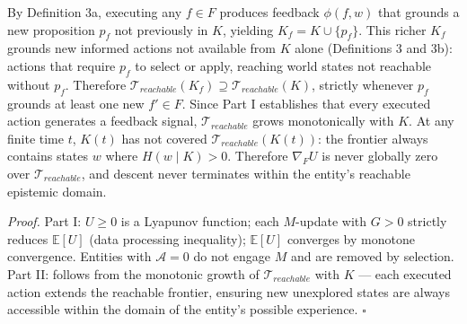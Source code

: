 \documentclass[
]{article}
\begin{document}
By Definition 3a, executing any \(f \in F\) produces feedback
\(\phi(f, w)\) that grounds a new proposition \(p_f\) not previously in
\(K\), yielding \(K_f = K \cup \{p_f\}\). This richer \(K_f\) grounds
new informed actions not available from \(K\) alone (Definitions 3 and
3b): actions that require \(p_f\) to select or apply, reaching world
states not reachable without \(p_f\). Therefore
\(\mathcal{T}_{reachable}(K_f) \supseteq
\mathcal{T}_{reachable}(K)\), strictly whenever \(p_f\) grounds at least
one new \(f' \in F\). Since Part I establishes that every executed
action generates a feedback signal, \(\mathcal{T}_{reachable}\) grows
monotonically with \(K\). At any finite time \(t\), \(K(t)\) has not
covered \(\mathcal{T}_{reachable}(K(t))\): the frontier always contains
states \(w\) where \(H(w \mid K) > 0\). Therefore \(\nabla_F U\) is
never globally zero over \(\mathcal{T}_{reachable}\), and descent never
terminates within the entity's reachable epistemic domain.

\emph{Proof.} Part I: \(U \geq 0\) is a Lyapunov function; each
\(M\)-update with \(G > 0\) strictly reduces \(\mathbb{E}[U]\) (data
processing inequality); \(\mathbb{E}[U]\) converges by monotone
convergence. Entities with \(\mathcal{A} = 0\) do not engage \(M\) and
are removed by selection. Part II: follows from the monotonic growth of
\(\mathcal{T}_{reachable}\) with \(K\) --- each executed action extends
the reachable frontier, ensuring new unexplored states are always
accessible within the domain of the entity's possible experience.
\(\square\)
\end{document}
